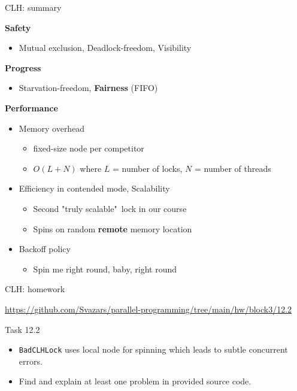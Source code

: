\begin{frame}{CLH: summary}

\textbf{Safety}
\begin{itemize}
  \item Mutual exclusion, Deadlock-freedom, Visibility
\end{itemize}

\textbf{Progress}
\begin{itemize}
  \item Starvation-freedom, \textbf{Fairness} (FIFO)
\end{itemize}

\textbf{Performance}
\begin{itemize}
  \item Memory overhead
  \begin{itemize}
    \item fixed-size node per competitor
    \item $O(L+N)$ where $L$ = number of locks, $N$ = number of threads
  \end{itemize}
  \item Efficiency in contended mode, Scalability
  \begin{itemize}
    \item Second "truly scalable"\ lock in our course
    \item Spins on random \textbf{remote} memory location
  \end{itemize}  
  \item Backoff policy  
  \begin{itemize}
    \item Spin me right round, baby, right round
  \end{itemize}  
\end{itemize}
\end{frame}


\begin{frame}[t]{CLH: homework}

{\small\url{https://github.com/Svazars/parallel-programming/tree/main/hw/block3/12.2}}
\begin{homeworkmail}{Task 12.2}
    \begin{itemize}      
      \item \texttt{BadCLHLock} uses local node for spinning which leads to subtle concurrent errors. 
      \item Find and explain at least one problem in provided source code.
    \end{itemize}
\end{homeworkmail}

\end{frame}

